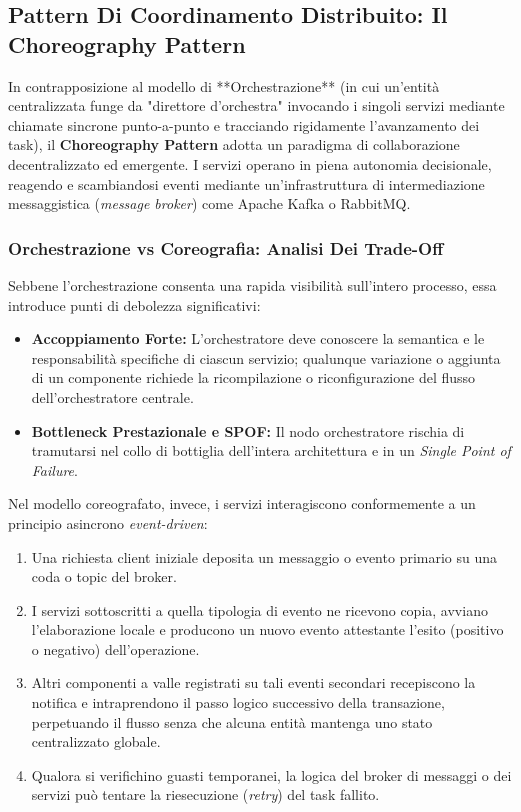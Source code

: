 \documentclass[11pt, a4paper]{article}
\begin{document}
\subsection{Pattern Di Coordinamento Distribuito: Il Choreography Pattern}

In contrapposizione al modello di **Orchestrazione** (in cui un'entità centralizzata funge da "direttore d'orchestra" invocando i singoli servizi mediante chiamate sincrone punto-a-punto e tracciando rigidamente l'avanzamento dei task), il \textbf{Choreography Pattern} adotta un paradigma di collaborazione decentralizzato ed emergente. I servizi operano in piena autonomia decisionale, reagendo e scambiandosi eventi mediante un'infrastruttura di intermediazione messaggistica (\emph{message broker}) come Apache Kafka o RabbitMQ.

\subsubsection{Orchestrazione vs Coreografia: Analisi Dei Trade-Off}

Sebbene l'orchestrazione consenta una rapida visibilità sull'intero processo, essa introduce punti di debolezza significativi:
\begin{itemize}[noitemsep]
    \item \textbf{Accoppiamento Forte:} L'orchestratore deve conoscere la semantica e le responsabilità specifiche di ciascun servizio; qualunque variazione o aggiunta di un componente richiede la ricompilazione o riconfigurazione del flusso dell'orchestratore centrale.
    \item \textbf{Bottleneck Prestazionale e SPOF:} Il nodo orchestratore rischia di tramutarsi nel collo di bottiglia dell'intera architettura e in un \emph{Single Point of Failure}.
\end{itemize}

Nel modello coreografato, invece, i servizi interagiscono conformemente a un principio asincrono \emph{event-driven}:


\begin{enumerate}
    \item Una richiesta client iniziale deposita un messaggio o evento primario su una coda o topic del broker.
    \item I servizi sottoscritti a quella tipologia di evento ne ricevono copia, avviano l'elaborazione locale e producono un nuovo evento attestante l'esito (positivo o negativo) dell'operazione.
    \item Altri componenti a valle registrati su tali eventi secondari recepiscono la notifica e intraprendono il passo logico successivo della transazione, perpetuando il flusso senza che alcuna entità mantenga uno stato centralizzato globale.
    \item Qualora si verifichino guasti temporanei, la logica del broker di messaggi o dei servizi può tentare la riesecuzione (\emph{retry}) del task fallito.
\end{enumerate}
\end{document}
